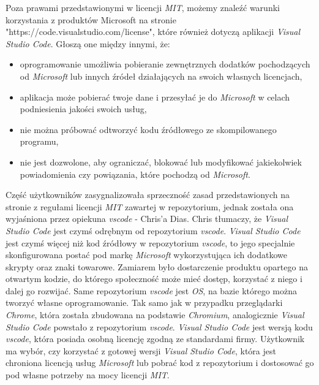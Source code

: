 \documentclass{article}
\begin{document}
Poza prawami przedstawionymi w licencji \emph{MIT}, możemy znaleźć warunki korzystania z produktów Microsoft na stronie "https://code.visualstudio.com/license"\cite{vscode.microsoft}, które również dotyczą aplikacji \emph{Visual Studio Code}. Głoszą one między innymi, że:
\begin{itemize}
    \item oprogramowanie umożliwia pobieranie zewnętrznych dodatków pochodzących od \emph{Microsoft} lub innych źródeł działających na swoich własnych licencjach,
    \item aplikacja może pobierać twoje dane i przesyłać je do \emph{Microsoft} w celach podniesienia jakości swoich usług,
    \item nie można próbować odtworzyć kodu źródłowego ze skompilowanego programu,
    \item nie jest dozwolone, aby ograniczać, blokować lub modyfikować jakiekolwiek powiadomienia czy powiązania, które pochodzą od \emph{Microsoft}\cite{vscode.microsoft}.
\end{itemize}

Część użytkowników zasygnalizowała sprzeczność zasad przedstawionych na stronie z regułami licencji \emph{MIT} zawartej w repozytorium, jednak została ona wyjaśniona przez opiekuna \emph{vscode} - Chris'a Dias. Chris tłumaczy, że \emph{Visual Studio Code} jest czymś odrębnym od repozytorium \emph{vscode}. \emph{Visual Studio Code} jest czymś więcej niż kod źródłowy w repozytorium \emph{vscode}, to jego specjalnie skonfigurowana postać pod markę \emph{Microsoft} wykorzystująca ich dodatkowe skrypty oraz znaki towarowe. Zamiarem było dostarczenie produktu opartego na otwartym kodzie, do którego społeczność może mieć dostęp, korzystać z niego i dalej go rozwijać. Same repozytorium \emph{vscode} jest \emph{OS}, na bazie którego można tworzyć własne oprogramowanie. Tak samo jak w przypadku przeglądarki \emph{Chrome}, która została zbudowana na podstawie \emph{Chromium}, analogicznie \emph{Visual Studio Code} powstało z repozytorium \emph{vscode}. \emph{Visual Studio Code} jest wersją kodu \emph{vscode}, która posiada osobną licencję zgodną ze standardami firmy. Użytkownik ma wybór, czy korzystać z gotowej wersji \emph{Visual Studio Code}, która jest chroniona licencją usług \emph{Microsoft} lub pobrać kod z repozytorium i dostosować go pod własne potrzeby na mocy licencji \emph{MIT}\cite{vscode.issues}.
\end{document}

